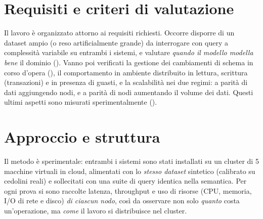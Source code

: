 \section{Requisiti e criteri di valutazione}
\label{sec:requisiti}

Il lavoro è organizzato attorno ai requisiti richiesti. Occorre disporre di un dataset ampio (o reso
artificialmente grande) da interrogare con query a complessità variabile su entrambi i sistemi, e valutare
\emph{quando il modello modella bene} il dominio (). Vanno poi verificati la gestione
dei cambiamenti di schema in corso d'opera (), il comportamento in ambiente distribuito
in lettura, scrittura (transazioni) e in presenza di guasti, e la scalabilità nei due regimi: a parità di
dati aggiungendo nodi, e a parità di nodi aumentando il volume dei dati. Questi ultimi aspetti sono misurati
sperimentalmente ().

\section{Approccio e struttura}
\label{sec:approccio}

Il metodo è sperimentale: entrambi i sistemi sono stati installati su un cluster di 5 macchine virtuali in
cloud, alimentati con lo \emph{stesso dataset} sintetico (calibrato su cedolini reali) e sollecitati con una
suite di query identica nella semantica. Per ogni prova si sono raccolte latenza, throughput e uso di
risorse (CPU, memoria, I/O di rete e disco) \emph{di ciascun nodo}, così da osservare non solo \emph{quanto}
costa un'operazione, ma \emph{come} il lavoro si distribuisce nel cluster.
